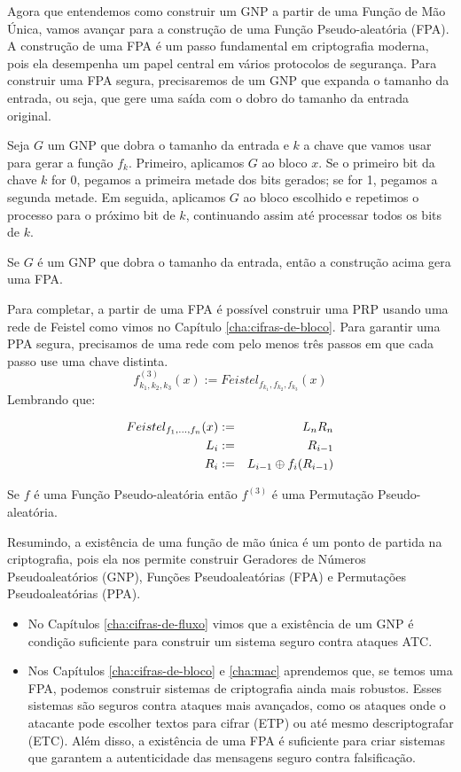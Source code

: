 Agora que entendemos como construir um GNP a partir de uma Função de Mão Única, vamos avançar para a construção de uma Função Pseudo-aleatória (FPA).
A construção de uma FPA é um passo fundamental em criptografia moderna, pois ela desempenha um papel central em vários protocolos de segurança.
Para construir uma FPA segura, precisaremos de um GNP que expanda o tamanho da entrada, ou seja, que gere uma saída com o dobro do tamanho da entrada original. 

Seja $G$ um GNP que dobra o tamanho da entrada e $k$ a chave que vamos usar para gerar a função $f_k$.
Primeiro, aplicamos $G$ ao bloco $x$.
Se o primeiro bit da chave $k$ for 0, pegamos a primeira metade dos bits gerados; se for 1, pegamos a segunda metade.
Em seguida, aplicamos $G$ ao bloco escolhido e repetimos o processo para o próximo bit de $k$, continuando assim até processar todos os bits de $k$.

\begin{theorem}[Yao]
  Se $G$ é um GNP que dobra o tamanho da entrada, então a construção acima gera uma FPA.
\end{theorem}

Para completar, a partir de uma FPA é possível construir uma PRP usando uma rede de Feistel como vimos no Capítulo \ref{cha:cifras-de-bloco}.
Para garantir uma PPA segura, precisamos de uma rede com pelo menos três passos em que cada passo use uma chave distinta.
\begin{displaymath}
  f_{k_1,k_2,k_3}^{(3)}(x) := Feistel_{f_{k_1},f_{k_2},f_{k_3}}(x)
\end{displaymath}
Lembrando que:

\begin{eqnarray*}
  Feistel_{f_1,\dots,f_n}(x) & := & L_nR_n\\
  L_i & := & R_{i-1}\\
  R_i & := & L_{i-1} \oplus f_i(R_{i-1})
\end{eqnarray*}


\begin{theorem}
  Se $f$ é uma Função Pseudo-aleatória então $f^{(3)}$ é uma Permutação Pseudo-aleatória.
\end{theorem}

Resumindo, a existência de uma função de mão única é um ponto de partida na criptografia, pois ela nos permite construir Geradores de Números Pseudoaleatórios (GNP), Funções Pseudoaleatórias (FPA) e Permutações Pseudoaleatórias (PPA).
\begin{itemize}
\item No Capítulos \ref{cha:cifras-de-fluxo} vimos que a existência de um GNP é condição suficiente para construir um sistema seguro contra ataques ATC.
\item Nos Capítulos \ref{cha:cifras-de-bloco} e \ref{cha:mac} aprendemos que, se temos uma FPA, podemos construir sistemas de criptografia ainda mais robustos. Esses sistemas são seguros contra ataques mais avançados, como os ataques onde o atacante pode escolher textos para cifrar (ETP) ou até mesmo descriptografar (ETC).
  Além disso, a existência de uma FPA é suficiente para criar sistemas que garantem a autenticidade das mensagens seguro contra falsificação.
\end{itemize}

